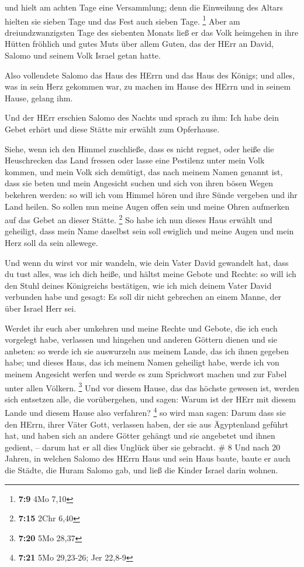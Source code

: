  und hielt am achten Tage eine Versammlung; denn die
Einweihung des Altars hielten sie sieben Tage und das Fest auch sieben
Tage. \footnote{\textbf{7:9} 4Mo 7,10}  Aber am
dreiundzwanzigsten Tage des siebenten Monats ließ er das Volk heimgehen
in ihre Hütten fröhlich und gutes Muts über allem Guten, das der HErr an
David, Salomo und seinem Volk Israel getan hatte.

 Also vollendete Salomo das Haus des HErrn und das Haus des
Königs; und alles, was in sein Herz gekommen war, zu machen im Hause des
HErrn und in seinem Hause, gelang ihm.

 Und der HErr erschien Salomo des Nachts und sprach zu ihm:
Ich habe dein Gebet erhört und diese Stätte mir erwählt zum Opferhause.

 Siehe, wenn ich den Himmel zuschließe, dass es nicht
regnet, oder heiße die Heuschrecken das Land fressen oder lasse eine
Pestilenz unter mein Volk kommen,  und mein Volk sich
demütigt, das nach meinem Namen genannt ist, dass sie beten und mein
Angesicht suchen und sich von ihren bösen Wegen bekehren werden: so will
ich vom Himmel hören und ihre Sünde vergeben und ihr Land heilen.
 So sollen nun meine Augen offen sein und meine Ohren
aufmerken auf das Gebet an dieser Stätte. \footnote{\textbf{7:15} 2Chr
  6,40}  So habe ich nun dieses Haus erwählt und geheiligt,
dass mein Name daselbst sein soll ewiglich und meine Augen und mein Herz
soll da sein allewege.

 Und wenn du wirst vor mir wandeln, wie dein Vater David
gewandelt hat, dass du tust alles, was ich dich heiße, und hältst meine
Gebote und Rechte:  so will ich den Stuhl deines
Königreichs bestätigen, wie ich mich deinem Vater David verbunden habe
und gesagt: Es soll dir nicht gebrechen an einem Manne, der über Israel
Herr sei.

 Werdet ihr euch aber umkehren und meine Rechte und Gebote,
die ich euch vorgelegt habe, verlassen und hingehen und anderen Göttern
dienen und sie anbeten:  so werde ich sie auswurzeln aus
meinem Lande, das ich ihnen gegeben habe; und dieses Haus, das ich
meinem Namen geheiligt habe, werde ich von meinem Angesicht werfen und
werde es zum Sprichwort machen und zur Fabel unter allen Völkern.
\footnote{\textbf{7:20} 5Mo 28,37}  Und vor diesem Hause,
das das höchste gewesen ist, werden sich entsetzen alle, die
vorübergehen, und sagen: Warum ist der HErr mit diesem Lande und diesem
Hause also verfahren? \footnote{\textbf{7:21} 5Mo 29,23-26; Jer 22,8-9}
 so wird man sagen: Darum dass sie den HErrn, ihrer Väter
Gott, verlassen haben, der sie aus Ägyptenland geführt hat, und haben
sich an andere Götter gehängt und sie angebetet und ihnen gedient, --
darum hat er all dies Unglück über sie gebracht. \# 8  Und
nach 20 Jahren, in welchen Salomo des HErrn Haus und sein Haus baute,
 baute er auch die Städte, die Huram Salomo gab, und ließ
die Kinder Israel darin wohnen.

